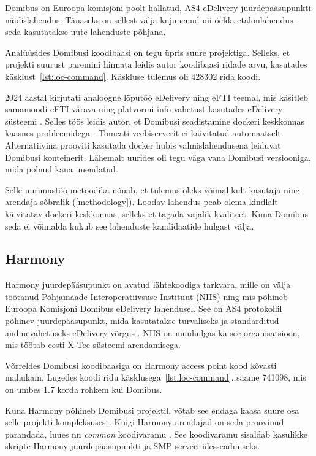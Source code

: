 Domibus on Euroopa komisjoni poolt hallatud, AS4 eDelivery juurdepääsupunkti näidislahendus. 
Tänaseks on sellest välja kujunenud nii-öelda etalonlahendus - seda kasutatakse uute lahenduste põhjana.

Analüüsides Domibusi koodibaasi on tegu üpris suure projektiga. Selleks, et projekti suurust paremini
hinnata leidis autor koodibaasi ridade arvu, kasutades käsklust~\ref{lst:loc-command}.
Käskluse tulemus oli 428302 rida koodi.

2024 aastal kirjutati analoogne lõputöö eDelivery ning eFTI teemal,
mis käsitleb samamoodi eFTI värava ning platvormi info vahetust kasutades eDelivery süsteemi \cite{malk_efti_andmevahetus_2024}.
Selles töös leidis autor, et Domibusi seadistamine dockeri keskkonnas kaasnes probleemidega - 
Tomcati veebiserverit ei käivitatud automaatselt. Alternatiivina prooviti kasutada docker hubis valmislahendusena 
leiduvat Domibusi konteinerit. Lähemalt uurides oli tegu väga vana Domibusi versiooniga, mida polnud kaua uuendatud.

Selle uurimustöö metoodika nõuab, et tulemus oleks võimalikult kasutaja ning arendaja sõbralik (\ref{methodology}).
Loodav lahendus peab olema kindlalt käivitatav dockeri keskkonnas, selleks et tagada vajalik kvaliteet.
Kuna Domibus seda ei võimalda kukub see lahenduste kandidaatide hulgast välja.

\subsection{Harmony}
Harmony juurdepääsupunkt on avatud lähtekoodiga tarkvara, 
mille on välja töötanud Põhjamaade Interoperatiivsuse Instituut (NIIS) ning mis põhineb
Euroopa Komisjoni Domibus eDelivery lahendusel. 
See on AS4 protokollil põhinev juurdepääsupunkt, mida kasutatakse turvaliseks ja standarditud 
andmevahetuseks eDelivery võrgus \cite{ria_harmony_access_point}.  
NIIS on muuhulgas ka see organisatsioon, mis töötab eesti X-Tee süsteemi arendamisega.

Võrreldes Domibusi koodibaasiga on Harmony access point kood \cite{niis_harmony_access_point_repo} kõvasti mahukam.
Lugedes koodi ridu käsklusega~\ref{lst:loc-command}, 
saame 741098, mis on umbes 1.7 korda rohkem kui Domibus.

Kuna Harmony põhineb Domibusi projektil, võtab see endaga kaasa suure osa selle projekti kompleksusest.
Kuigi Harmony arendajad on seda proovinud parandada, 
luues nn \textit{common} koodivaramu \cite{niis_harmony_common_repo}.
See koodivaramu sisaldab kasulikke skripte Harmony juurdepääsupunkti ja SMP serveri ülesseadmiseks.

